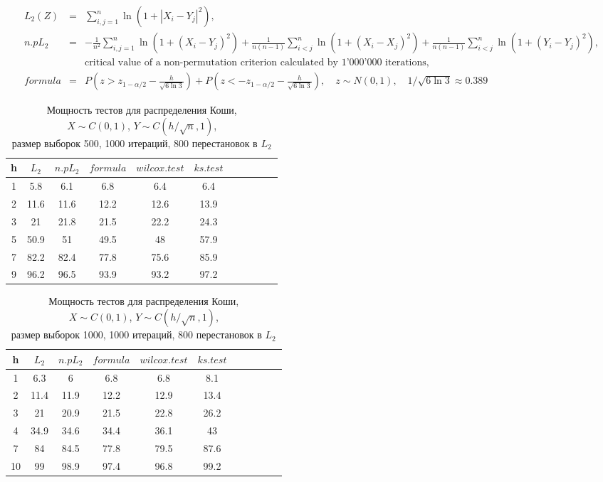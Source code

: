 \documentclass{report}
\begin{document}
\begin{eqnarray*}
  L_2(Z)&=&\sum_{i,j=1}^{n}{\ln(1+|X_{i}-Y_{j}|^2)},\\
  n.pL_2 &=& -\frac{1}{n^2}\sum_{i,j=1}^n\ln(1+(X_i-Y_j)^2)+\frac{1}{n(n-1)}\sum_{i<j}^n\ln(1+(X_i-X_j)^2)+\frac{1}{n(n-1)}\sum_{i<j}^n\ln(1+(Y_i-Y_j)^2),\\
  && \text{critical value of a non-permutation criterion calculated by 1'000'000 iterations}, \\
  formula &=& P(z > z_{1-\alpha/2} - \frac{h}{\sqrt{6\ln 3}}) + P(z < -z_{1-\alpha/2} - \frac{h}{\sqrt{6\ln 3}}),\quad z\sim N(0,1),\quad 1/\sqrt{6\ln 3}\approx 0.389
\end{eqnarray*}

\begin{longtable}{|c|c|c|c|c|c|c|c|c|c|c|}
  \caption{Мощность тестов для распределения Коши, \\
           $X\sim C(0,1)$, $Y\sim C(h/\sqrt{n},1)$, \\
           размер выборок 500, 1000 итераций, 800 перестановок в $L_2$} \\
  \hline
  h & $L_2$ & $n.pL_2$ & $formula$ & $wilcox.test$ & $ks.test$ \\ \hline
  1 & 5.8   & 6.1      & 6.8       & 6.4           & 6.4       \\
  2 & 11.6  & 11.6     & 12.2      & 12.6          & 13.9      \\
  3 & 21    & 21.8     & 21.5      & 22.2          & 24.3      \\
  5 & 50.9  & 51       & 49.5      & 48            & 57.9      \\
  7 & 82.2  & 82.4     & 77.8      & 75.6          & 85.9      \\
  9 & 96.2  & 96.5     & 93.9      & 93.2          & 97.2      \\ \hline
\end{longtable}

\begin{longtable}{|c|c|c|c|c|c|c|c|c|c|c|}
  \caption{Мощность тестов для распределения Коши, \\
           $X\sim C(0,1)$, $Y\sim C(h/\sqrt{n},1)$, \\
           размер выборок 1000, 1000 итераций, 800 перестановок в $L_2$} \\
  \hline
  h  & $L_2$ & $n.pL_2$ & $formula$ & $wilcox.test$ & $ks.test$ \\ \hline
  1  & 6.3   & 6        & 6.8       & 6.8           & 8.1       \\
  2  & 11.4  & 11.9     & 12.2      & 12.9          & 13.4      \\
  3  & 21    & 20.9     & 21.5      & 22.8          & 26.2      \\
  4  & 34.9  & 34.6     & 34.4      & 36.1          & 43        \\
  7  & 84    & 84.5     & 77.8      & 79.5          & 87.6      \\
  10 & 99    & 98.9     & 97.4      & 96.8          & 99.2      \\ \hline
\end{longtable}
\end{document}
